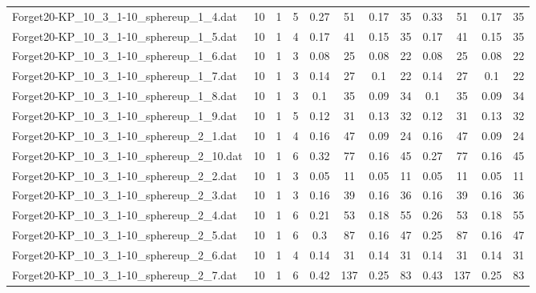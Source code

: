\begin{sidewaystable}[!ht]
{\begin{tabular}{lccccccccccc}
Forget20-KP\_10\_3\_1-10\_sphereup\_1\_4.dat & 10 & 1 & 5 & 0.27 & 51 & 0.17 & 35 & 0.33 & 51 & 0.17 & 35 \\
Forget20-KP\_10\_3\_1-10\_sphereup\_1\_5.dat & 10 & 1 & 4 & 0.17 & 41 &  \textcolor{blue2}{0.15} & 35 & 0.17 & 41 &  \textcolor{blue2}{0.15} & 35 \\
Forget20-KP\_10\_3\_1-10\_sphereup\_1\_6.dat & 10 & 1 & 3 &  \textcolor{blue2}{0.08} & 25 &  \textcolor{blue2}{0.08} & 22 &  \textcolor{blue2}{0.08} & 25 &  \textcolor{blue2}{0.08} & 22 \\
Forget20-KP\_10\_3\_1-10\_sphereup\_1\_7.dat & 10 & 1 & 3 & 0.14 & 27 &  \textcolor{blue2}{0.1} & 22 & 0.14 & 27 &  \textcolor{blue2}{0.1} & 22 \\
Forget20-KP\_10\_3\_1-10\_sphereup\_1\_8.dat & 10 & 1 & 3 & 0.1 & 35 &  \textcolor{blue2}{0.09} & 34 & 0.1 & 35 &  \textcolor{blue2}{0.09} & 34 \\
Forget20-KP\_10\_3\_1-10\_sphereup\_1\_9.dat & 10 & 1 & 5 &  \textcolor{blue2}{0.12} & 31 & 0.13 & 32 &  \textcolor{blue2}{0.12} & 31 & 0.13 & 32 \\
Forget20-KP\_10\_3\_1-10\_sphereup\_2\_1.dat & 10 & 1 & 4 & 0.16 & 47 &  \textcolor{blue2}{0.09} & 24 & 0.16 & 47 &  \textcolor{blue2}{0.09} & 24 \\
Forget20-KP\_10\_3\_1-10\_sphereup\_2\_10.dat & 10 & 1 & 6 & 0.32 & 77 &  \textcolor{blue2}{0.16} & 45 & 0.27 & 77 &  \textcolor{blue2}{0.16} & 45 \\
Forget20-KP\_10\_3\_1-10\_sphereup\_2\_2.dat & 10 & 1 & 3 &  \textcolor{blue2}{0.05} & 11 &  \textcolor{blue2}{0.05} & 11 &  \textcolor{blue2}{0.05} & 11 &  \textcolor{blue2}{0.05} & 11 \\
Forget20-KP\_10\_3\_1-10\_sphereup\_2\_3.dat & 10 & 1 & 3 &  \textcolor{blue2}{0.16} & 39 &  \textcolor{blue2}{0.16} & 36 &  \textcolor{blue2}{0.16} & 39 &  \textcolor{blue2}{0.16} & 36 \\
Forget20-KP\_10\_3\_1-10\_sphereup\_2\_4.dat & 10 & 1 & 6 & 0.21 & 53 &  \textcolor{blue2}{0.18} & 55 & 0.26 & 53 &  \textcolor{blue2}{0.18} & 55 \\
Forget20-KP\_10\_3\_1-10\_sphereup\_2\_5.dat & 10 & 1 & 6 & 0.3 & 87 &  \textcolor{blue2}{0.16} & 47 & 0.25 & 87 &  \textcolor{blue2}{0.16} & 47 \\
Forget20-KP\_10\_3\_1-10\_sphereup\_2\_6.dat & 10 & 1 & 4 &  \textcolor{blue2}{0.14} & 31 &  \textcolor{blue2}{0.14} & 31 &  \textcolor{blue2}{0.14} & 31 &  \textcolor{blue2}{0.14} & 31 \\
Forget20-KP\_10\_3\_1-10\_sphereup\_2\_7.dat & 10 & 1 & 6 & 0.42 & 137 & 0.25 & 83 & 0.43 & 137 & 0.25 & 83 \\

\end{tabular}}
\end{sidewaystable}
